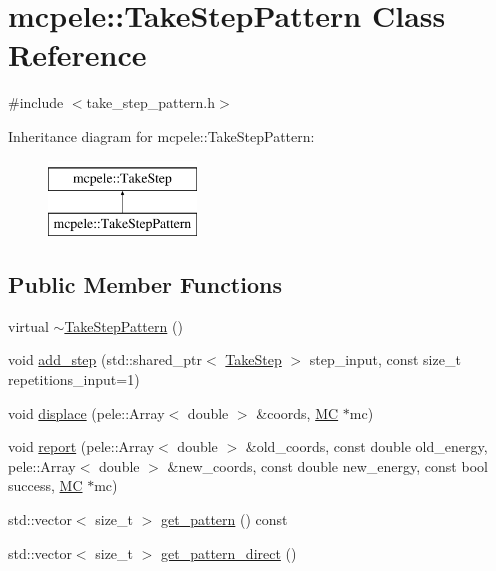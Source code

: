 \hypertarget{classmcpele_1_1TakeStepPattern}{\section{mcpele\-:\-:\-Take\-Step\-Pattern \-Class \-Reference}
\label{classmcpele_1_1TakeStepPattern}
}


{\ttfamily \#include $<$take\-\_\-step\-\_\-pattern.\-h$>$}

\-Inheritance diagram for mcpele\-:\-:\-Take\-Step\-Pattern\-:\begin{figure}[H]
\begin{center}
\leavevmode
\includegraphics[height=2.000000cm]{classmcpele_1_1TakeStepPattern}
\end{center}
\end{figure}
\subsection*{\-Public \-Member \-Functions}
\begin{DoxyCompactItemize}
\item 
virtual \hyperlink{classmcpele_1_1TakeStepPattern_a574b72c67af41877b638d08b7a57e81b}{$\sim$\-Take\-Step\-Pattern} ()
\item 
void \hyperlink{classmcpele_1_1TakeStepPattern_a1bfe8206991a6aad0fdefe5ec916b31c}{add\-\_\-step} (std\-::shared\-\_\-ptr$<$ \hyperlink{classmcpele_1_1TakeStep}{\-Take\-Step} $>$ step\-\_\-input, const size\-\_\-t repetitions\-\_\-input=1)
\item 
void \hyperlink{classmcpele_1_1TakeStepPattern_a8c5ef12183c58b84b3ff5e9276ec8688}{displace} (pele\-::\-Array$<$ double $>$ \&coords, \hyperlink{classmcpele_1_1MC}{\-M\-C} $\ast$mc)
\item 
void \hyperlink{classmcpele_1_1TakeStepPattern_a6038fb5304e2a31c105fa5b537ee1b6c}{report} (pele\-::\-Array$<$ double $>$ \&old\-\_\-coords, const double old\-\_\-energy, pele\-::\-Array$<$ double $>$ \&new\-\_\-coords, const double new\-\_\-energy, const bool success, \hyperlink{classmcpele_1_1MC}{\-M\-C} $\ast$mc)
\item 
std\-::vector$<$ size\-\_\-t $>$ \hyperlink{classmcpele_1_1TakeStepPattern_a811124bbaa7ee317943d6bedb8155711}{get\-\_\-pattern} () const 
\item 
std\-::vector$<$ size\-\_\-t $>$ \hyperlink{classmcpele_1_1TakeStepPattern_ac6bf72bf5bb87c1fdd67999d88d85ed2}{get\-\_\-pattern\-\_\-direct} ()
\end{DoxyCompactItemize}


